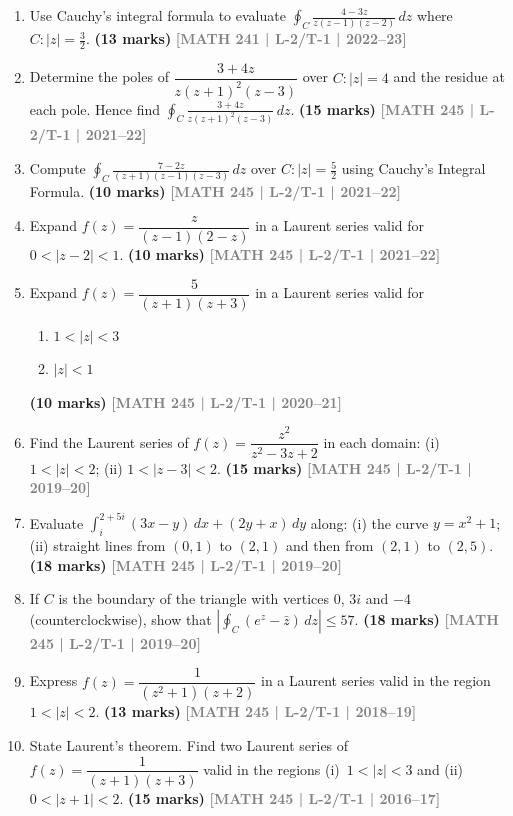 \documentclass[12pt,a4paper]{article}
\newcommand{\yr}[1]{\hfill\textcolor{gray}{\small\textbf{[#1]}}}
\newcommand{\mk}[1]{\textcolor{orange!70!black}{\small\textbf{(#1 marks)}}}
\begin{document}
\begin{enumerate}
\item Use Cauchy's integral formula to evaluate $\displaystyle\oint_{C}\frac{4-3z}{z(z-1)(z-2)}\,dz$ where $C:|z|=\tfrac{3}{2}$.
\mk{13} \yr{MATH 241 | L-2/T-1 | 2022--23}

\item Determine the poles of $\dfrac{3+4z}{z(z+1)^{2}(z-3)}$ over $C:|z|=4$ and the residue at each pole. Hence find $\displaystyle\oint_{C}\frac{3+4z}{z(z+1)^{2}(z-3)}\,dz$.
\mk{15} \yr{MATH 245 | L-2/T-1 | 2021--22}

\item Compute $\displaystyle\oint_{C}\frac{7-2z}{(z+1)(z-1)(z-3)}\,dz$ over $C:|z|=\tfrac{5}{2}$ using Cauchy's Integral Formula.
\mk{10} \yr{MATH 245 | L-2/T-1 | 2021--22}

\item Expand $f(z)=\dfrac{z}{(z-1)(2-z)}$ in a Laurent series valid for $0<|z-2|<1$.
\mk{10} \yr{MATH 245 | L-2/T-1 | 2021--22}

\item Expand $f(z)=\dfrac{5}{(z+1)(z+3)}$ in a Laurent series valid for
\begin{enumerate}
  \item $1<|z|<3$
  \item $|z|<1$
\end{enumerate}
\mk{10} \yr{MATH 245 | L-2/T-1 | 2020--21}

\item Find the Laurent series of $f(z)=\dfrac{z^{2}}{z^{2}-3z+2}$ in each domain: (i) $1<|z|<2$; (ii) $1<|z-3|<2$.
\mk{15} \yr{MATH 245 | L-2/T-1 | 2019--20}

\item Evaluate $\displaystyle\int_{i}^{2+5i}(3x-y)\,dx+(2y+x)\,dy$ along: (i) the curve $y=x^{2}+1$; (ii) straight lines from $(0,1)$ to $(2,1)$ and then from $(2,1)$ to $(2,5)$.
\mk{18} \yr{MATH 245 | L-2/T-1 | 2019--20}

\item If $C$ is the boundary of the triangle with vertices $0$, $3i$ and $-4$ (counterclockwise), show that $\left|\displaystyle\oint_{C}(e^{z}-\bar{z})\,dz\right|\le 57$.
\mk{18} \yr{MATH 245 | L-2/T-1 | 2019--20}

\item Express $f(z)=\dfrac{1}{(z^{2}+1)(z+2)}$ in a Laurent series valid in the region $1<|z|<2$.
\mk{13} \yr{MATH 245 | L-2/T-1 | 2018--19}

\item State Laurent's theorem. Find two Laurent series of $f(z)=\dfrac{1}{(z+1)(z+3)}$ valid in the regions (i)~$1<|z|<3$ and (ii)~$0<|z+1|<2$.
\mk{15} \yr{MATH 245 | L-2/T-1 | 2016--17}


\end{enumerate}
\end{document}
